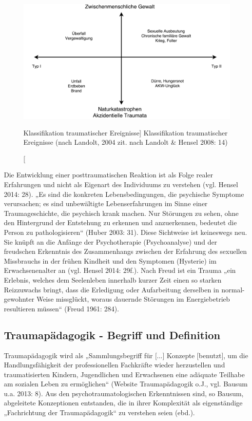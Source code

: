 \begin{figure}[h]
  \centering
  \includegraphics[scale=0.5]{abbildung1}
  \caption
      [Klassifikation traumatischer Ereignisse]
      {Klassifikation traumatischer Ereignisse (nach Landolt, 2004 zit. nach Landolt \& Hensel 2008: 14)}
\end{figure}

Die Entwicklung einer posttraumatischen Reaktion ist als Folge realer Erfahrungen und nicht als Eigenart des Individuums zu verstehen (vgl. Hensel 2014: 28). „Es sind die konkreten Lebensbedingungen, die psychische Symptome verursachen; es sind unbewältigte Lebenserfahrungen im Sinne einer Traumageschichte, die psychisch krank machen. Nur Störungen zu sehen, ohne den Hintergrund der Entstehung zu erkennen und anzuerkennen, bedeutet die Person zu pathologisieren“ (Huber 2003: 31). Diese Sichtweise ist keineswegs neu. Sie knüpft an die Anfänge der Psychotherapie (Psychoanalyse) und der freudschen Erkenntnis des Zusammenhangs zwischen der Erfahrung des sexuellen Missbrauchs in der frühen Kindheit und den Symptomen (Hysterie) im Erwachsenenalter an (vgl. Hensel 2014: 29f.). Nach Freud ist ein Trauma „ein Erlebnis, welches dem Seelenleben innerhalb kurzer Zeit einen so starken Reizzuwachs bringt, dass die Erledigung oder Aufarbeitung derselben in normal-gewohnter Weise missglückt, woraus dauernde Störungen im Energiebetrieb resultieren müssen“ (Freud 1961: 284). 

\subsection{Traumapädagogik - Begriff und Definition}
Traumapädagogik wird als „Sammlungsbegriff für [...] Konzepte [benutzt], um die Handlungsfähigkeit der professionellen Fachkräfte wieder herzustellen und traumatisierten Kindern, Jugendlichen und Erwachsenen eine adäquate Teilhabe am sozialen Leben zu ermöglichen“ (Website Traumapädagogik o.J., vgl. Bausum u.a. 2013: 8). Aus den psychotraumatologischen Erkenntnissen sind, so Bausum, abgeleitete Konzeptionen entstanden, die in ihrer Komplexität als eigenständige „Fachrichtung der Traumapädagogik“ zu verstehen seien (ebd.).  

